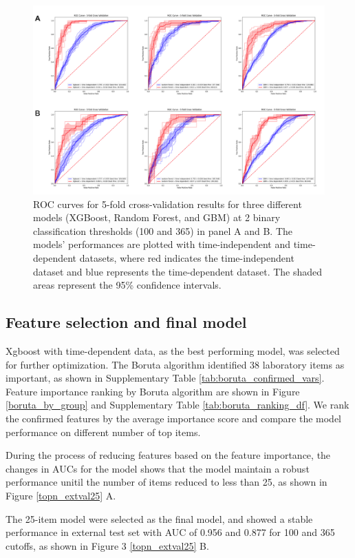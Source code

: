 \documentclass[final,3p,times,authoryear]{elsarticle}
\begin{document}
\begin{figure}[t] 
    \centering 
    \includegraphics[width=0.8\linewidth]{figures/kfoldfirst3.png} 
    \caption{ROC curves for 5-fold cross-validation results for three different models (XGBoost, Random Forest, and GBM) at 2 binary classification thresholds (100 and 365) in panel A and B. The models' performances are plotted with time-independent and time-dependent datasets, where red indicates the time-independent dataset and blue represents the time-dependent dataset. The shaded areas represent the 95\% confidence intervals.}\label{kfoldfirst3} 
\end{figure}


\subsection{Feature selection and final model}\label{FinalModel}

Xgboost with time-dependent data, as the best performing model, was selected for further optimization. The Boruta algorithm identified 38 laboratory items as important, as shown in Supplementary Table \ref{tab:boruta_confirmed_vars}. Feature importance ranking by Boruta algorithm are shown in Figure \ref{boruta_by_group} and Supplementary Table \ref{tab:boruta_ranking_df}. We rank the confirmed features by the average importance score and compare the model performance on different number of top items.

During the process of reducing features based on the feature importance, the changes in AUCs for the model shows that the model maintain a robust performance unitil the number of items reduced to less than 25, as shown in Figure \ref{topn_extval25} A.

The 25-item model were selected as the final model, and showed a stable performance in external test set with AUC of 0.956 and 0.877 for 100 and 365 cutoffs, as shown in Figure 3 \ref{topn_extval25} B.
\end{document}
